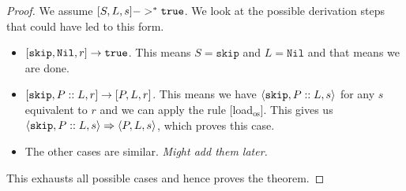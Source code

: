 \begin{proof}
We assume $[ S, L, s ] ->^* \texttt{true}$. We look at the possible derivation steps that could have led to this form. 
\begin{itemize}[noitemsep]
    \item $[ \texttt{skip}, \texttt{Nil}, r ] \to \texttt{true}$. This means $S = \texttt{skip}$ and $L = \texttt{Nil}$ and that means we are done.
    \item $[ \texttt{skip}, P::L,  r ] \to [ P, L, r ]$. This means we have $\langle \texttt{skip}, P::L, s \rangle$ for any $s$ equivalent to $r$ and we can apply the rule [load$_{\textrm{os}}$]. This gives us $\langle \texttt{skip}, P::L, s \rangle \Rightarrow \langle P, L, s \rangle$, which proves this case. 
     \item The other cases are similar. \emph{Might add them later.}
\end{itemize}
This exhausts all possible cases and hence proves the theorem.
\end{proof}

 




